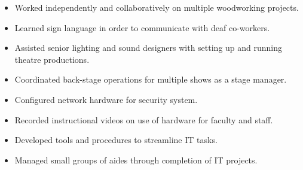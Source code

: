 \documentclass[10pt,a4paper,ragged2e,withhyper]{altacv}
\begin{document}
\divider{}

\begin{itemize}
\item Worked independently and collaboratively on multiple woodworking projects.
\item Learned sign language in order to communicate with deaf co-workers.
\item Assisted senior lighting and sound designers with setting up and running theatre productions.
\item Coordinated back-stage operations for multiple shows as a stage manager.
\end{itemize}

\divider{}

\begin{itemize}
\item Configured network hardware for security system.
\item Recorded instructional videos on use of hardware for faculty and staff.
\item Developed tools and procedures to streamline IT tasks.
\item Managed small groups of aides through completion of IT projects.
\end{itemize}




















\end{document}
